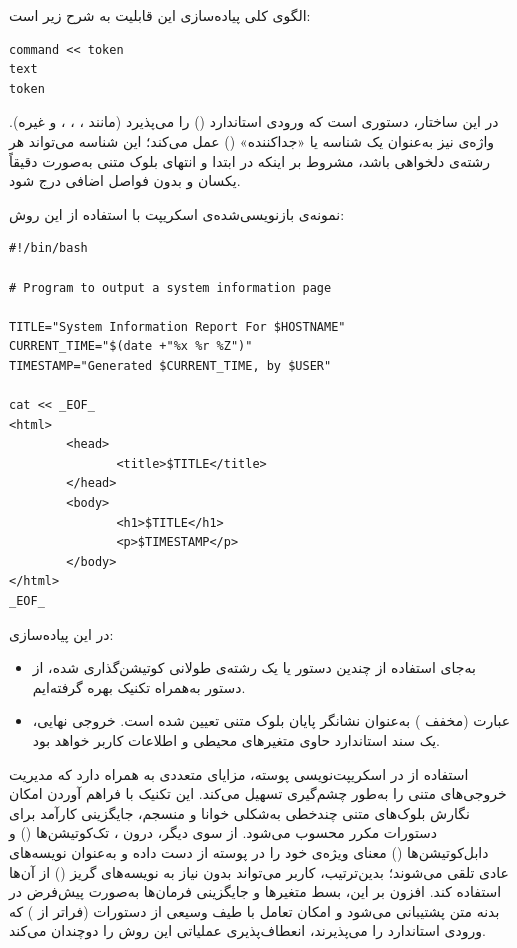 الگوی کلی پیاده‌سازی این قابلیت به شرح زیر است:

\begin{latin}
\begin{lstlisting}
command << token
text
token
\end{lstlisting}
\end{latin}

در این ساختار،  دستوری است که ورودی استاندارد () را می‌پذیرد (مانند ، ، ،  و غیره). واژه‌ی  نیز به‌عنوان یک شناسه یا «جداکننده» () عمل می‌کند؛ این شناسه می‌تواند هر رشته‌ی دلخواهی باشد، مشروط بر اینکه در ابتدا و انتهای بلوک متنی به‌صورت دقیقاً یکسان و بدون فواصل اضافی درج شود.

نمونه‌ی بازنویسی‌شده‌ی اسکریپت با استفاده از این روش:

\begin{latin}
\begin{lstlisting}
#!/bin/bash

# Program to output a system information page

TITLE="System Information Report For $HOSTNAME"
CURRENT_TIME="$(date +"%x %r %Z")"
TIMESTAMP="Generated $CURRENT_TIME, by $USER"

cat << _EOF_
<html>
        <head>
               <title>$TITLE</title>
        </head>
        <body>
               <h1>$TITLE</h1>
               <p>$TIMESTAMP</p>
        </body>
</html>
_EOF_
\end{lstlisting}
\end{latin}

در این پیاده‌سازی:

\begin{itemize}
  \item به‌جای استفاده از چندین دستور  یا یک رشته‌ی طولانی کوتیشن‌گذاری شده، از دستور  به‌همراه تکنیک  بهره گرفته‌ایم.
  \item عبارت  (مخفف ) به‌عنوان نشانگر پایان بلوک متنی تعیین شده است. خروجی نهایی، یک سند  استاندارد حاوی متغیرهای محیطی و اطلاعات کاربر خواهد بود.
\end{itemize}

استفاده از  در اسکریپت‌نویسی پوسته، مزایای متعددی به همراه دارد که مدیریت خروجی‌های متنی را به‌طور چشم‌گیری تسهیل می‌کند. این تکنیک با فراهم آوردن امکان نگارش بلوک‌های متنی چندخطی به‌شکلی خوانا و منسجم، جایگزینی کارآمد برای دستورات مکرر  محسوب می‌شود. از سوی دیگر، درون ، تک‌کوتیشن‌ها () و دابل‌کوتیشن‌ها () معنای ویژه‌ی خود را در پوسته از دست داده و به‌عنوان نویسه‌های عادی تلقی می‌شوند؛ بدین‌ترتیب، کاربر می‌تواند بدون نیاز به نویسه‌های گریز (\cmd{\textbackslash}) از آن‌ها استفاده کند. افزون بر این، بسط متغیرها و جایگزینی فرمان‌ها به‌صورت پیش‌فرض در بدنه متن پشتیبانی می‌شود و امکان تعامل با طیف وسیعی از دستورات (فراتر از ) که ورودی استاندارد را می‌پذیرند، انعطاف‌پذیری عملیاتی این روش را دوچندان می‌کند.

